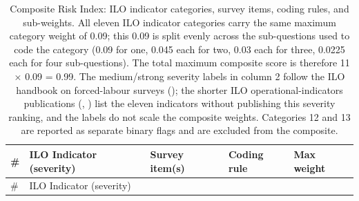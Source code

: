 \documentclass[
  12pt,
  letterpaper,
  DIV=11,
  numbers=noendperiod]{scrreprt}
\begin{document}
\begin{longtable}[]{@{}
  >{\raggedright\arraybackslash}p{}
  >{\raggedright\arraybackslash}p{}
  >{\raggedright\arraybackslash}p{}
  >{\raggedright\arraybackslash}p{}
  >{\raggedright\arraybackslash}p{}@{}}
\caption{Composite Risk Index: ILO indicator categories, survey items,
coding rules, and sub-weights. All eleven ILO indicator categories carry
the same maximum category weight of 0.09; this 0.09 is split evenly
across the sub-questions used to code the category (0.09 for one, 0.045
each for two, 0.03 each for three, 0.0225 each for four sub-questions).
The total maximum composite score is therefore 11 × 0.09 = 0.99. The
medium/strong severity labels in column 2 follow the ILO handbook on
forced-labour surveys (); the shorter ILO operational-indicators
publications (, ) list the eleven
indicators without publishing this severity ranking, and the labels do
not scale the composite weights. Categories 12 and 13 are reported as
separate binary flags and are excluded from the
composite.}\label{tbl-composite}\tabularnewline
\toprule\noalign{}
\begin{minipage}[b]{\linewidth}\raggedright
\#
\end{minipage} & \begin{minipage}[b]{\linewidth}\raggedright
ILO Indicator (severity)
\end{minipage} & \begin{minipage}[b]{\linewidth}\raggedright
Survey item(s)
\end{minipage} & \begin{minipage}[b]{\linewidth}\raggedright
Coding rule
\end{minipage} & \begin{minipage}[b]{\linewidth}\raggedright
Max weight
\end{minipage} \\
\midrule\noalign{}
\endfirsthead
\toprule\noalign{}
\begin{minipage}[b]{\linewidth}\raggedright
\#
\end{minipage} & \begin{minipage}[b]{\linewidth}\raggedright
ILO Indicator (severity)
\end{minipage} & \begin{minipage}[b]{\linewidth}\raggedright

\end{minipage}
\end{longtable}
\end{document}
